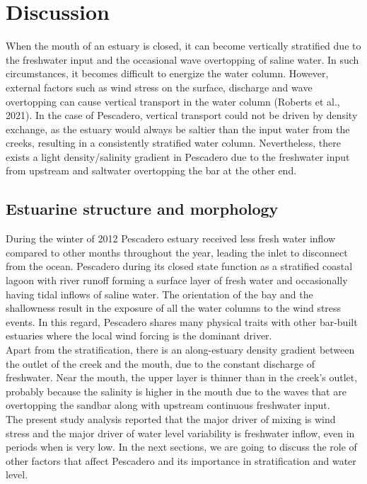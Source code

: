 \documentclass[tesis.tex]{subfiles}
\begin{document}
    
\section{Discussion}

When the mouth of an estuary is closed, it can become vertically stratified due to the freshwater input and the occasional wave overtopping of saline water. In such circumstances, it becomes difficult to energize the water column. However, external factors such as wind stress on the surface, discharge and wave overtopping can cause vertical transport in the water column (Roberts et al., 2021). In the case of Pescadero, vertical transport could not be driven by density exchange, as the estuary would always be saltier than the input water from the creeks, resulting in a consistently stratified water column. Nevertheless, there exists a light density/salinity gradient in Pescadero due to the freshwater input from upstream and saltwater overtopping the bar at the other end.\\

\subsection{Estuarine structure and morphology}

During the winter of 2012 Pescadero estuary received less fresh water inflow compared to other months throughout the year, leading the inlet to disconnect from the ocean. Pescadero during its closed state function as a stratified coastal lagoon with river runoff forming a surface layer of fresh water and occasionally having tidal inflows of saline water. The orientation of the bay and the shallowness result in the exposure of all the water columns to the wind stress events. In this regard, Pescadero shares many physical traits with other bar-built estuaries where the local wind forcing is the dominant driver.\\

Apart from the stratification, there is an along-estuary density gradient between the outlet of the creek and the mouth, due to the constant discharge of freshwater. Near the mouth, the upper layer is thinner than in the creek's outlet, probably because the salinity is higher in the mouth due to the waves that are overtopping the sandbar along with upstream continuous freshwater input.\\

The present study analysis reported that the major driver of mixing is wind stress and the major driver of water level variability is freshwater inflow, even in periods when is very low. In the next sections, we are going to discuss the role of other factors that affect Pescadero and its importance in stratification and water level.\\
\end{document}
